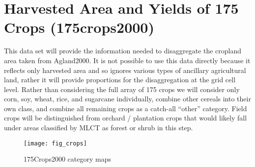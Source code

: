 \begin{comment}
\section{Cropland Data Layer (CDL)}
\label{sec:cdl}

\missingfigure{Table or chart showing CDL covereage for various years}

The CDL is only available for a small number of states in 2001.  If
time allows it might be good to compare what is available with our
results as another independent evaluation against a higher-resolution
data set.

\subsection{Reclassification}
\label{sec:cdl-reclass}





\todo{Calculate CDL mask for 5-arcmin cells completely filled}
\todo(Calculate CDL aggregated in GRASS}




\missingfigure{CDL reclassification table}

\subsection{Aggregation}
\label{sec:cdl-aggr}
\end{comment}

\section{Harvested Area and Yields of 175 Crops (175crops2000)}
\label{sec:175crops2000}

\citet{Monfreda2008}




This data set will provide the information needed to disaggregate the
cropland area taken from Agland2000.  It is not possible to use this
data directly because it reflects only harvested area and so ignores
various types of ancillary agricultural land, rather it will provide
proportions for the disaggregation at the grid cell level.  Rather
than considering the full array of 175 crops we will consider only
corn, soy, wheat, rice, and sugarcane individually, combine other
cereals into their own class, and combine all remaining crops as a
catch-all ``other'' category.  Field crops will be distinguished from
orchard / plantation crops that would likely fall under areas
classified by MLCT as forest or shrub in this step.


\begin{figure} 
\begin{center} 


\texttt{[image: fig\_crops]}
\end{center} 
\caption{175Crops2000 category maps} 
\label{fig:crops} 
\end{figure} 


